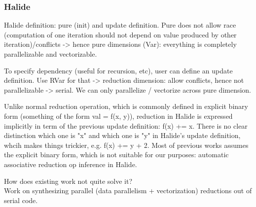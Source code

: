 \subsubsection{Halide}

Halide definition: pure (init) and update definition. Pure does not allow race (computation of one iteration should not depend on value produced by other iteration)/conflicts -> hence pure dimensions (Var):  everything is completely parallelizable and vectorizable.

To specify dependency (useful for recursion, etc), user can define an update definition. Use RVar for that -> reduction dimension: allow conflicts, hence not parallelizable -> serial. We can only parallelize / vectorize across pure dimension.

Unlike normal reduction operation, which is commonly defined in explicit binary form (something of the form val = f(x, y)), reduction in Halide is expressed implicitly in term of the previous update definition: f(x) += x. There is no clear distinction which one is "x" and which one is "y" in Halide's update definition, whcih makes things trickier, e.g. f(x) += y + 2. Most of previous works assumes the explicit binary form, which is not suitable for our purposes: automatic associative reduction op inference in Halide.	

How does existing work not quite solve it? \\

Work on synthesizing parallel (data parallelism + vectorization) reductions out of serial code. \\

